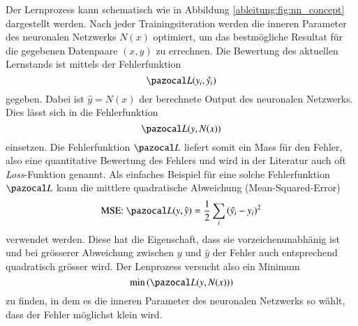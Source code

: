 Der Lernprozess kann schematisch wie in Abbildung
\ref{ableitung:fig:nn_concept} dargestellt werden.
%
Nach jeder Trainingsiteration werden die inneren Parameter des
neuronalen Netzwerks $N(x)$ optimiert, um das bestmögliche Resultat
für die gegebenen Datenpaare $(x,y)$ zu errechnen.
Die Bewertung des aktuellen Lernstands ist mittels der Fehlerfunktion
\begin{equation}
	\Lb(y_{i},\hat{y_i})
\end{equation}
gegeben. Dabei ist
$
\hat{y} = N(x)
$
der berechnete Output des neuronalen Netzwerks.
Dies lässt sich in die Fehlerfunktion
\begin{equation}
\Lb(y,N(x))
\label{ableitung:eqn:loss_net}
\end{equation}
einsetzen.
Die Fehlerfunktion $\Lb$ liefert somit ein Mass für den Fehler,
also eine quantitative Bewertung des Fehlers und wird in der Literatur
auch oft {\em Loss}-Funktion genannt.
%
%
Als einfaches Beispiel für eine solche Fehlerfunktion $\Lb$ kann die
mittlere quadratische Abweichung (Mean-Squared-Error)
\begin{equation}
\text{MSE: } \Lb (y, \hat{y}) = \frac{1}{2} \sum_i \left( \hat{y_i} - y_i \right)^2
\label{ableitung:eqn:loss}
\end{equation}
verwendet werden. Diese hat die Eigenschaft, dass sie vorzeichenunabhänig ist und bei grösserer Abweichung zwischen $y$ und $\hat{y}$ der Fehler auch entsprechend quadratisch grösser wird.
Der Lenprozess versucht also ein Minimum 
\begin{equation}
	\min \left( \Lb(y,N(x)) \right) 
	\label{ableitung:eqn:min_loss}
\end{equation}
zu finden, in dem es die inneren Parameter des neuronalen Netzwerks so wählt, dass der Fehler möglichst klein wird.
